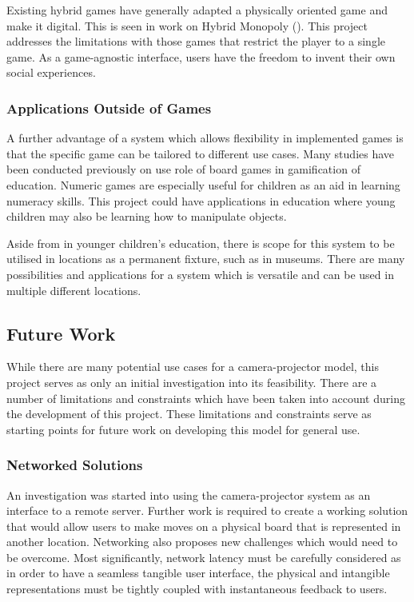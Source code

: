 \documentclass[12pt]{article}
\begin{document}
Existing hybrid games have generally adapted a physically oriented game and make it digital. 
This is seen in work on Hybrid Monopoly (\cite{park2017hybrid}). 
This project addresses the limitations with those games that restrict the player to a single game. 
As a game-agnostic interface, users have the freedom to invent their own social experiences. 

\subsubsection{Applications Outside of Games}
A further advantage of a system which allows flexibility in implemented games is that the specific game can be tailored to different use cases. 
Many studies have been conducted previously on use role of board games in gamification of education. 
Numeric games are especially useful for children as an aid in learning numeracy skills. 
This project could have applications in education where young children may also be learning how to manipulate objects. 

Aside from in younger children's education, there is scope for this system to be utilised in locations as a permanent fixture, such as in museums. 
There are many possibilities and applications for a system which is versatile and can be used in multiple different locations. 

\subsection{Future Work}
While there are many potential use cases for a camera-projector model, this project serves as only an initial investigation into its feasibility. 
There are a number of limitations and constraints which have been taken into account during the development of this project. 
These limitations and constraints serve as starting points for future work on developing this model for general use. 

\subsubsection{Networked Solutions}
An investigation was started into using the camera-projector system as an interface to a remote server. Further work is required to create a working solution that would allow users to make moves on a physical board that is represented in another location. Networking also proposes new challenges which would need to be overcome. Most significantly, network latency must be carefully considered as in order to have a seamless tangible user interface, the physical and intangible representations must be tightly coupled with instantaneous feedback to users. 
\end{document}
